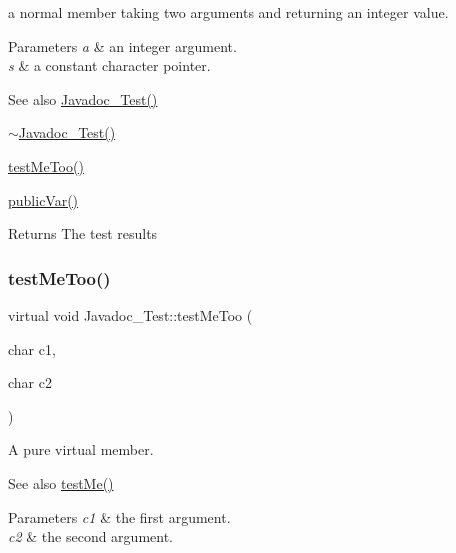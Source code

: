 a normal member taking two arguments and returning an integer value. 
\begin{DoxyParams}{Parameters}
{\em a} & an integer argument. \\
\hline
{\em s} & a constant character pointer. \\
\hline
\end{DoxyParams}
\begin{DoxySeeAlso}{See also}
\hyperlink{class_javadoc___test_a17313327932ae97596b0a455ba8342cc}{Javadoc\+\_\+\+Test()} 

\hyperlink{class_javadoc___test_a60016cd15a4ed82bbc35be79a0a6a6b5}{$\sim$\+Javadoc\+\_\+\+Test()} 

\hyperlink{class_javadoc___test_ac2b39cabbe80957ae3e8bc2bd4e887f6}{test\+Me\+Too()} 

\hyperlink{class_javadoc___test_a44a516fbc3a4865e2dcae34649c9df6a}{public\+Var()} 
\end{DoxySeeAlso}
\begin{DoxyReturn}{Returns}
The test results 
\end{DoxyReturn}
\hypertarget{class_javadoc___test_ac2b39cabbe80957ae3e8bc2bd4e887f6}{}\label{class_javadoc___test_ac2b39cabbe80957ae3e8bc2bd4e887f6} 
\subsubsection{\texorpdfstring{test\+Me\+Too()}{testMeToo()}}
{\footnotesize\ttfamily virtual void Javadoc\+\_\+\+Test\+::test\+Me\+Too (\begin{DoxyParamCaption}\item[{char}]{c1,  }\item[{char}]{c2 }\end{DoxyParamCaption})\hspace{0.3cm}{\ttfamily [pure virtual]}}

A pure virtual member. \begin{DoxySeeAlso}{See also}
\hyperlink{class_javadoc___test_a0c472683ed25ff096e8a9edfb18d550c}{test\+Me()} 
\end{DoxySeeAlso}

\begin{DoxyParams}{Parameters}
{\em c1} & the first argument. \\
\hline
{\em c2} & the second argument. \\
\hline
\end{DoxyParams}


